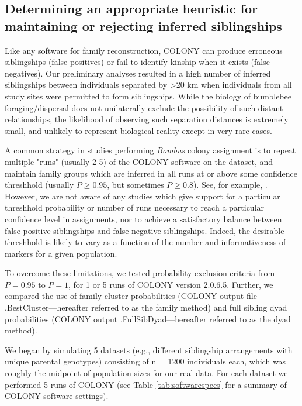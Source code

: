 \documentclass[12pt]{article}
\begin{document}
\subsection{Determining an appropriate heuristic for maintaining or rejecting inferred siblingships}

Like any software for family reconstruction, COLONY can produce erroneous siblingships (false positives) or fail to identify kinship when it exists (false negatives). Our preliminary analyses resulted in a high number of inferred siblingships between individuals separated by >20 km when individuals from all study sites were permitted to form siblingships. While the biology of bumblebee foraging/dispersal does not unilaterally exclude the possibility of such distant relationships, the likelihood of observing such separation distances is extremely small, and unlikely to represent biological reality except in very rare cases.

A common strategy in studies performing \emph{Bombus} colony assignment is to repeat multiple "runs" (usually 2-5) of the COLONY software on the dataset, and maintain family groups which are inferred in all runs at or above some confidence threshhold (usually $P \ge 0.95$, but sometimes $P \ge 0.8$). See, for example, \textcite{carvellMolecularSpatialAnalyses2012, raoBumbleBeeHymenoptera2012, dreierFinescaleSpatialGenetic2014a, geibBumbleBeeNest2015a, carvellBumblebeeFamilyLineage2017a, molaWildfireRevealsTransient2020a}. However, we are not aware of any studies which give support for a particular threshhold probability or number of runs necessary to reach a particular confidence level in assignments, nor to achieve a satisfactory balance between false positive siblingships and false negative siblingships. Indeed, the desirable threshhold is likely to vary as a function of the number and informativeness of markers for a given population.

To overcome these limitations, we tested probability exclusion criteria from $P = 0.95$ to $P = 1$, for 1 or 5 runs of COLONY version 2.0.6.5. Further, we compared the use of family cluster probabilities (COLONY output file .BestCluster---hereafter referred to as the family method) and full sibling dyad probabilities (COLONY output .FullSibDyad---hereafter referred to as the dyad method).

We began by simulating 5 datasets (e.g., different siblingship arrangements with unique parental genotypes) consisting of n = 1200 individuals each, which was roughly the midpoint of population sizes for our real data. For each dataset we performed 5 runs of COLONY (see Table \ref{tab:softwarespecs} for a summary of COLONY software settings).
\end{document}
